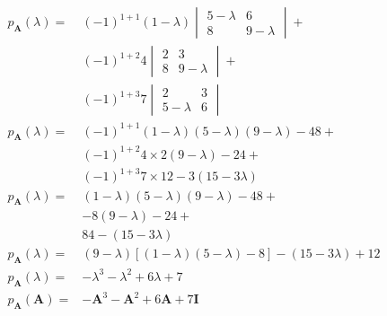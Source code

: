 \documentclass[10pt]{article}
\begin{document}
\begin{equation} 
\begin{aligned}
    p_{\mathbf{A}}(\lambda) = 
    & (-1)^{1+1} (1 - \lambda) 
    \begin{vmatrix}
    5 - \lambda & 6 \\
    8 & 9 - \lambda  
    \end{vmatrix} +  \\
    & (-1)^{1+2} 4 
    \begin{vmatrix}
    2 & 3 \\ 
    8 & 9 - \lambda 
    \end{vmatrix} +  \\
    & (-1)^{1+3} 7 
    \begin{vmatrix}
    2 & 3 \\
    5 - \lambda & 6 
    \end{vmatrix} \\
    p_{\mathbf{A}}(\lambda) = 
    & (-1)^{1+1} (1 - \lambda)(5- \lambda)(9-\lambda) - 48 + \\ 
    & (-1)^{1+2} 4 \times 2 (9-\lambda) - 24 + \\ 
    & (-1)^{1+3} 7 \times 12 - 3 (15 - 3 \lambda) \\ 
    p_{\mathbf{A}}(\lambda) = 
    & (1 - \lambda)(5 - \lambda)(9 - \lambda) - 48 + \\ 
    & -8(9 - \lambda) - 24 +  \\
    & 84 - (15 - 3 \lambda) \\
    p_{\mathbf{A}}(\lambda) = 
    & (9 - \lambda) \left[ (1 - \lambda) (5 -\lambda) - 8 \right] - (15 - 3 \lambda) + 12 \\ 
    p_{\mathbf{A}}(\lambda) = 
    & - \lambda^{3} - \lambda^{2} + 6 \lambda + 7  \\ 
    p_{\mathbf{A}}(\mathbf{A}) = 
    & - \mathbf{A}^{3} - \mathbf{A}^{2} + 6 \mathbf{A} + 7\mathbf{I}  \nonumber \\ 
\end{aligned}
\end{equation}
\end{document}
